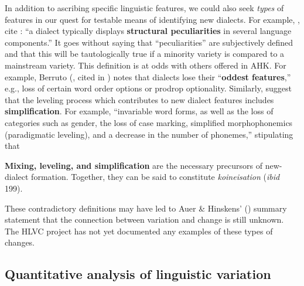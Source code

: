 \documentclass[output=paper]{LSP/langsci}
\begin{document}
In addition to ascribing specific linguistic features, we could also seek \textit{types} of features in our quest for testable means of identifying new dialects. For example, \citet[1]{auer_study_2004}, cite \citet[5]{chambers_dialectology_1998}: “a dialect typically displays \textbf{structural peculiarities }in several language components.” It goes without saying that “peculiarities” are subjectively defined and that this will be tautologically true if a minority variety is compared to a mainstream variety. This definition is at odds with others offered in AHK. For example, Berruto (\citeyear{berruto_fondamenti_1995}, cited in \citealt [11]{auer_study_2004}) notes that dialects lose their “\textbf{oddest features},” e.g., loss of certain word order options or prodrop optionality. Similarly, \citet[198]{auer_birth_2004} suggest that the leveling process which contributes to new dialect features includes \textbf{simplification}. For example, “invariable word forms, as well as the loss of categories such as gender, the loss of case marking, simplified morphophonemics (paradigmatic leveling), and a decrease in the number of phonemes,” stipulating that

\textbf{Mixing, leveling, and simplification }are the necessary precursors of new-dialect formation. Together, they can be said to constitute \textit{koineisation }(\textit{ibid} 199).

These contradictory definitions may have led to Auer \& Hinskens' (\citeyear[356]{auer_role_2005}) summary statement that the connection between variation and change is still unknown. The HLVC project has not yet documented any examples of these types of changes.

\subsection{Quantitative analysis of linguistic variation}
\end{document}
